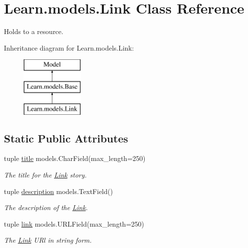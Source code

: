 \hypertarget{class_learn_1_1models_1_1_link}{\section{Learn.\-models.\-Link Class Reference}
\label{class_learn_1_1models_1_1_link}
}


Holds to a resource.  


Inheritance diagram for Learn.\-models.\-Link\-:\begin{figure}[H]
\begin{center}
\leavevmode
\includegraphics[height=3.000000cm]{class_learn_1_1models_1_1_link}
\end{center}
\end{figure}
\subsection*{Static Public Attributes}
\begin{DoxyCompactItemize}
\item 
\hypertarget{class_learn_1_1models_1_1_link_ae21cfe86a0aaeb6d3eeb01b695b74973}{tuple \hyperlink{class_learn_1_1models_1_1_link_ae21cfe86a0aaeb6d3eeb01b695b74973}{title} models.\-Char\-Field(max\-\_\-length=250)}\label{class_learn_1_1models_1_1_link_ae21cfe86a0aaeb6d3eeb01b695b74973}

\begin{DoxyCompactList}\small\item\em The title for the \hyperlink{class_learn_1_1models_1_1_link}{Link} story. \end{DoxyCompactList}\item 
\hypertarget{class_learn_1_1models_1_1_link_ab76a421b4eca1067173a38ff83ce8922}{tuple \hyperlink{class_learn_1_1models_1_1_link_ab76a421b4eca1067173a38ff83ce8922}{description} models.\-Text\-Field()}\label{class_learn_1_1models_1_1_link_ab76a421b4eca1067173a38ff83ce8922}

\begin{DoxyCompactList}\small\item\em The description of the \hyperlink{class_learn_1_1models_1_1_link}{Link}. \end{DoxyCompactList}\item 
\hypertarget{class_learn_1_1models_1_1_link_a03bc9e8cebd0340c75d15fd57fff99e1}{tuple \hyperlink{class_learn_1_1models_1_1_link_a03bc9e8cebd0340c75d15fd57fff99e1}{link} models.\-U\-R\-L\-Field(max\-\_\-length=250)}\label{class_learn_1_1models_1_1_link_a03bc9e8cebd0340c75d15fd57fff99e1}

\begin{DoxyCompactList}\small\item\em The \hyperlink{class_learn_1_1models_1_1_link}{Link} U\-Rl in string form. \end{DoxyCompactList}\end{DoxyCompactItemize}
